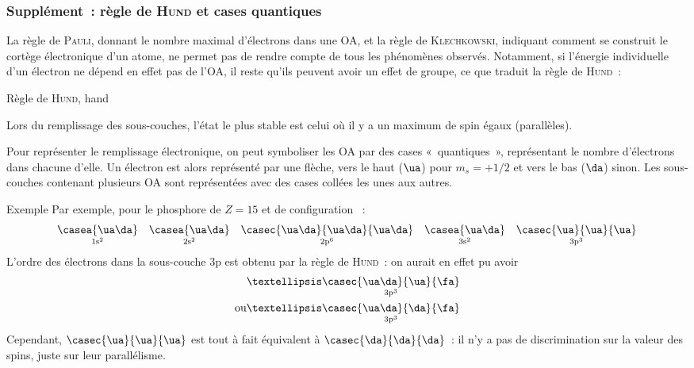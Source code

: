 \documentclass[../main/main.tex]{subfiles}
\begin{document}
\subsubsection{Supplément~: règle de \textsc{Hund} et cases quantiques}
La règle de \textsc{Pauli}, donnant le nombre maximal d'électrons dans une OA,
et la règle de \textsc{Klechkowski}, indiquant comment se construit le cortège
électronique d'un atome, ne permet pas de rendre compte de tous les phénomènes
observés. Notamment, si l'énergie individuelle d'un électron ne dépend en effet
pas de l'OA, il reste qu'ils peuvent avoir un effet de groupe, ce que traduit la
règle de \textsc{Hund}~:

\begin{tror}{Règle de \textsc{Hund}, hand}
    \begin{center}
        Lors du remplissage des sous-couches, l'état le plus stable est
        celui où il y a un maximum de spin égaux (parallèles).
    \end{center}
\end{tror}

Pour représenter le remplissage électronique, on peut symboliser les OA par des
cases «~quantiques~», représentant le nombre d'électrons dans chacune d'elle. Un
électron est alors représenté par une flèche, vers le haut ($\ua$) pour $m_s =
+1/2$ et vers le bas ($\da$) sinon. Les sous-couches contenant plusieurs OA sont
représentées avec des cases collées les unes aux autres.

\begin{rexem}{Exemple}
    Par exemple, pour le phosphore de $Z=15$ et de configuration ~:
    \[
        \underset{\rm 1s^2}{\casea{\ua\da}}
        \quad
        \underset{\rm 2s^2}{\casea{\ua\da}}
        \quad
        \underset{\rm 2p^6}{\casec{\ua\da}{\ua\da}{\ua\da}}
        \quad
        \underset{\rm 3s^2}{\casea{\ua\da}}
        \quad
        \underset{\rm 3p^3}{\casec{\ua}{\ua}{\ua}}
    \]
    L'ordre des électrons dans la sous-couche 3p est obtenu par la règle de
    \textsc{Hund}~: on aurait en effet pu avoir
    \begin{align*}
        &… \underset{\rm 3p^3}{\casec{\ua\da}{\ua}{\fa}}
        \\\text{ou}
        &… \underset{\rm 3p^3}{\casec{\ua\da}{\da}{\fa}}
    \end{align*}
    Cependant, $\casec{\ua}{\ua}{\ua}$ est tout à fait équivalent à
    $\casec{\da}{\da}{\da}$~: il n'y a pas de discrimination sur la valeur des
    spins, juste sur leur parallélisme.
\end{rexem}
\end{document}
